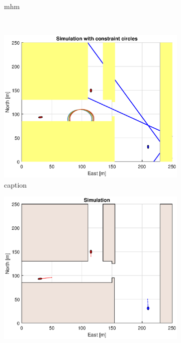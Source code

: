 \begin{figure}[!b]
\begin{subfigure}[b]{0.499\textwidth}
        \caption{mhm}
    \end{subfigure}
    \hfill
    \\
    \begin{subfigure}[b]{0.49\textwidth}
        \centering
        \includegraphics[width=\textwidth]{Images/Figures/Havn1/Simple1_f1_Frame2}
        \caption{caption}
    \end{subfigure}
    \hfill
    \begin{subfigure}[b]{0.499\textwidth}
        \centering
        \includegraphics[width=\textwidth]{Images/Figures/Havn1/Simple1_f600_Frame2}

\end{subfigure}
\end{figure}
